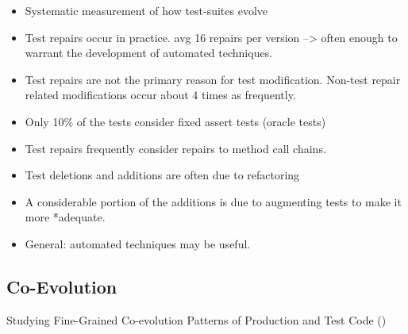 \documentclass[]{book}
\providecommand{\tightlist}{%
  \setlength{\itemsep}{0pt}\setlength{\parskip}{0pt}}
\begin{document}
\begin{itemize}
\tightlist
\item
  Systematic measurement of how test-suites evolve
\item
  Test repairs occur in practice. avg 16 repairs per version
  --\textgreater{} often enough to warrant the development of automated
  techniques.
\item
  Test repairs are not the primary reason for test modification.
  Non-test repair related modifications occur about 4 times as
  frequently.
\item
  Only 10\% of the tests consider fixed assert tests (oracle tests)
\item
  Test repairs frequently consider repairs to method call chains.
\item
  Test deletions and additions are often due to refactoring
\item
  A considerable portion of the additions is due to augmenting tests to
  make it more *adequate.
\item
  General: automated techniques may be useful.
\end{itemize}

\subsection{Co-Evolution}\label{co-evolution}

Studying Fine-Grained Co-evolution Patterns of Production and Test Code
(\citet{marsavina2014})
\end{document}
